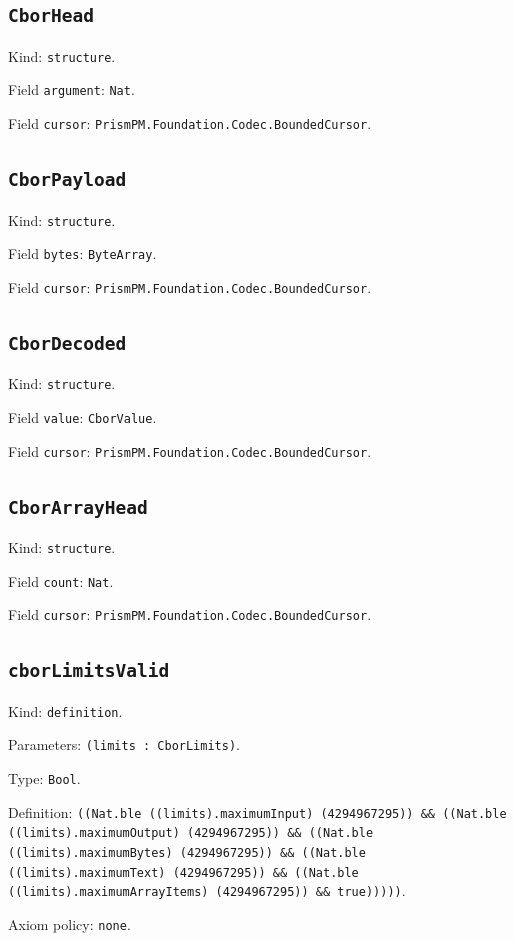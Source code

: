 \documentclass[11pt]{article}
\begin{document}
\subsection*{\texttt{CborHead}}
\noindent Kind: \texttt{structure}.\par
\noindent Field \texttt{argument}: \texttt{Nat}.\par
\noindent Field \texttt{cursor}: \texttt{PrismPM.Foundation.Codec.BoundedCursor}.\par
\subsection*{\texttt{CborPayload}}
\noindent Kind: \texttt{structure}.\par
\noindent Field \texttt{bytes}: \texttt{ByteArray}.\par
\noindent Field \texttt{cursor}: \texttt{PrismPM.Foundation.Codec.BoundedCursor}.\par
\subsection*{\texttt{CborDecoded}}
\noindent Kind: \texttt{structure}.\par
\noindent Field \texttt{value}: \texttt{CborValue}.\par
\noindent Field \texttt{cursor}: \texttt{PrismPM.Foundation.Codec.BoundedCursor}.\par
\subsection*{\texttt{CborArrayHead}}
\noindent Kind: \texttt{structure}.\par
\noindent Field \texttt{count}: \texttt{Nat}.\par
\noindent Field \texttt{cursor}: \texttt{PrismPM.Foundation.Codec.BoundedCursor}.\par
\subsection*{\texttt{cborLimitsValid}}
\noindent Kind: \texttt{definition}.\par
\noindent Parameters: \texttt{(limits : CborLimits)}.\par
\noindent Type: \texttt{Bool}.\par
\noindent Definition: \texttt{((Nat.ble ((limits).maximumInput) (4294967295)) \&\& ((Nat.ble ((limits).maximumOutput) (4294967295)) \&\& ((Nat.ble ((limits).maximumBytes) (4294967295)) \&\& ((Nat.ble ((limits).maximumText) (4294967295)) \&\& ((Nat.ble ((limits).maximumArrayItems) (4294967295)) \&\& true)))))}.\par
\noindent Axiom policy: \texttt{none}.\par
\end{document}
